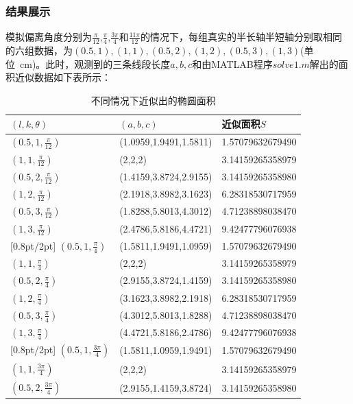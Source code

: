 \documentclass[a4paper,10.5pt]{ctexart}
\begin{document}
\subsubsection{结果展示}
\par 模拟偏离角度分别为$\frac{\pi}{12}$,$\frac{\pi}{4}$,$\frac{3\pi}{4}$和$\frac{11\pi}{12}$的情况下，每组真实的半长轴半短轴分别取相同的六组数据，为$(0.5,1),(1,1),(0.5,2),(1,2),(0.5,3),(1,3)$(单位\ cm)。此时，观测到的三条线段长度$a,b,c$和由MATLAB程序$solve1.m$解出的面积近似数据如下表所示：

\begin{table}[h]
\centering
\caption{不同情况下近似出的椭圆面积}
\begin{tabular}{C{4cm}C{5cm}C{4.5cm}}
\toprule[2pt]
\textbf{$(l,k,\theta)$}   & \textbf{$(a,b,c)$}      &  \textbf{近似面积$S$}  \\\midrule[1pt]
$(0.5,1,\frac{\pi}{12})$   & (1.0959,1.9491,1.5811)  & 1.57079632679490 \\
$(1,1,\frac{\pi}{12})$  & (2,2,2)     & 3.14159265358979 \\
$(0.5,2,\frac{\pi}{12})$ & (1.4159,3.8724,2.9155)  & 3.14159265358980 \\
$(1,2,\frac{\pi}{12})$  & (2.1918,3.8982,3.1623)  & 6.28318530717959 \\
$(0.5,3,\frac{\pi}{12})$   & (1.8288,5.8013,4.3012) & 4.71238898038470 \\
$(1,3,\frac{\pi}{12})$     & (2.4786,5.8186,4.4721)  & 9.42477796076938 \\[0.8pt/2pt]
$(0.5,1,\frac{\pi}{4})$    &  (1.5811,1.9491,1.0959) &  1.57079632679490  \\
$(1,1,\frac{\pi}{4})$      &    (2,2,2)  &   3.14159265358979         \\
$(0.5,2,\frac{\pi}{4})$    &  (2.9155,3.8724,1.4159)  &  3.14159265358980   \\
$(1,2,\frac{\pi}{4})$      &     (3.1623,3.8982,2.1918)&  6.28318530717959 \\
$(0.5,3,\frac{\pi}{4})$    &   (4.3012,5.8013,1.8288)     & 4.71238898038470 \\
$(1,3,\frac{\pi}{4})$      &    (4.4721,5.8186,2.4786)     &    9.42477796076938 \\[0.8pt/2pt]
$(0.5,1,\frac{3\pi}{4})$   & (1.5811,1.0959,1.9491)  & 1.57079632679490  \\
$(1,1,\frac{3\pi}{4})$     & (2,2,2)& 3.14159265358979    \\
$(0.5,2,\frac{3\pi}{4})$   &  (2.9155,1.4159,3.8724) &  3.14159265358980  \\

\end{tabular}
\end{table}
\end{document}
